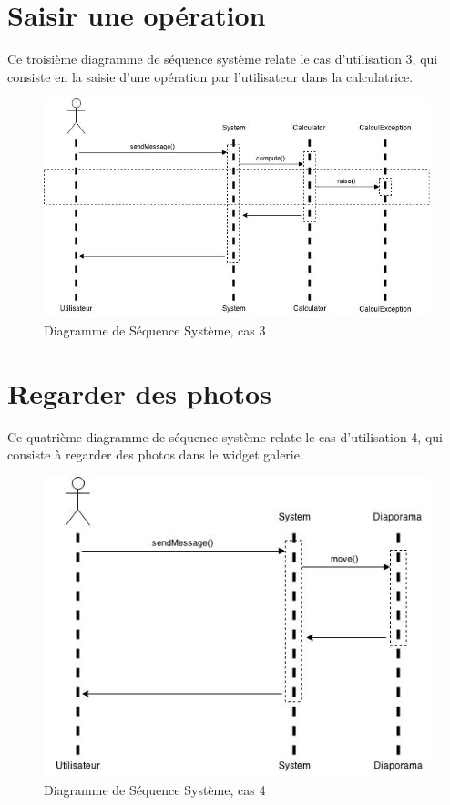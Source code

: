 \section{Saisir une opération}

Ce troisième diagramme de séquence système relate le cas d'utilisation
3, qui consiste en la saisie d'une opération par l'utilisateur dans la 
calculatrice.

\begin{figure}[h!]
	\centering
	\includegraphics[scale=0.4]{diagrammes/DSS3.jpg}
	\caption{Diagramme de Séquence Système, cas 3}
\end{figure}

\section{Regarder des photos}

Ce quatrième diagramme de séquence système relate le cas d'utilisation
4, qui consiste à regarder des photos dans le widget galerie.

\begin{figure}[h!]
	\centering
	\includegraphics[scale=0.4]{diagrammes/DSS4.jpg}
	\caption{Diagramme de Séquence Système, cas 4}
\end{figure}
\newpage


